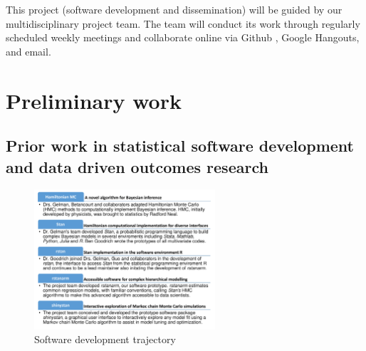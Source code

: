 \documentclass[11pt,notitlepage]{article}
\begin{document}
This project (software development and dissemination) will be guided by 
our multidisciplinary project team. The team will conduct its work through 
regularly scheduled weekly meetings and collaborate online via 
Github \cite{Chacon2009ProGit}, Google Hangouts, and email. 

\section*{Preliminary work}

\subsection*{Prior work in statistical software development and data driven outcomes research}

\begin{figure} 
 \vspace{- 15pt}
    \centering
\includegraphics[width=0.6\textwidth]{Figures/SoftwareTrajectory.pdf}
  \vspace{-32pt}
  \caption{Software development trajectory}
    \label{fig:trajectory}
 \vspace{- 15pt}
\end{figure}
 
\end{document}
